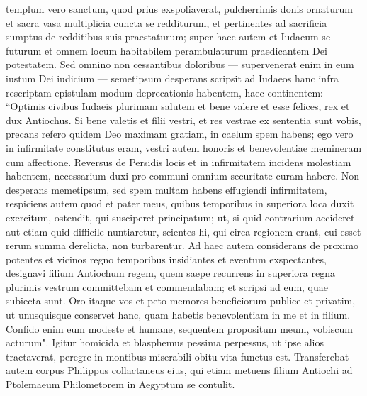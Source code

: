 \begin{biblechapter}
\verse templum vero sanctum, quod prius exspoliaverat, pulcherrimis donis ornaturum et sacra vasa multiplicia cuncta se redditurum, et pertinentes ad sacrificia sumptus de redditibus suis praestaturum; 
\verse super haec autem et Iudaeum se futurum et omnem locum habitabilem perambulaturum praedicantem Dei potestatem. 
\verse Sed omnino non cessantibus doloribus — supervenerat enim in eum iustum Dei iudicium — semetipsum desperans scripsit ad Iudaeos hanc infra rescriptam epistulam modum deprecationis habentem, haec continentem: 
\verse “Optimis civibus Iudaeis plurimam salutem et bene valere et esse felices, rex et dux Antiochus. 
\verse Si bene valetis et filii vestri, et res vestrae ex sententia sunt vobis, precans refero quidem Deo maximam gratiam, in caelum spem habens; 
\verse ego vero in infirmitate constitutus eram, vestri autem honoris et benevolentiae memineram cum affectione. Reversus de Persidis locis et in infirmitatem incidens molestiam habentem, necessarium duxi pro communi omnium securitate curam habere.  
\verse Non desperans memetipsum, sed spem multam habens effugiendi infirmitatem,  
\verse respiciens autem quod et pater meus, quibus temporibus in superiora loca duxit exercitum, ostendit, qui susciperet principatum; 
\verse ut, si quid contrarium accideret aut etiam quid difficile nuntiaretur, scientes hi, qui circa regionem erant, cui esset rerum summa derelicta, non turbarentur. 
\verse Ad haec autem considerans de proximo potentes et vicinos regno temporibus insidiantes et eventum exspectantes, designavi filium Antiochum regem, quem saepe recurrens in superiora regna plurimis vestrum committebam et commendabam; et scripsi ad eum, quae subiecta sunt. 
\verse Oro itaque vos et peto memores beneficiorum publice et privatim, ut unusquisque conservet hanc, quam habetis benevolentiam in me et in filium. 
\verse Confido enim eum modeste et humane, sequentem propositum meum, vobiscum acturum". 
\verse Igitur homicida et blasphemus pessima perpessus, ut ipse alios tractaverat, peregre in montibus miserabili obitu vita functus est. 
\verse Transferebat autem corpus Philippus collactaneus eius, qui etiam metuens filium Antiochi ad Ptolemaeum Philometorem in Aegyptum se contulit. 
\end{biblechapter}


